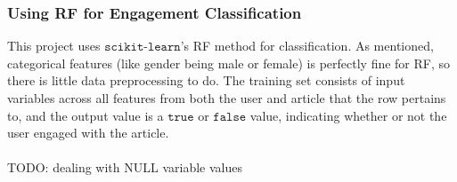 \subsubsection{Using RF for Engagement Classification}
This project uses $\texttt{scikit-learn}$'s RF method for classification.  As mentioned, categorical features (like gender being male or female) is perfectly fine for RF, so there is little data preprocessing to do.  The training set consists of input variables across all features from both the user and article that the row pertains to, and the output value is a $\texttt{true}$ or $\texttt{false}$ value, indicating whether or not the user engaged with the article.
\\\\
TODO: dealing with NULL variable values









